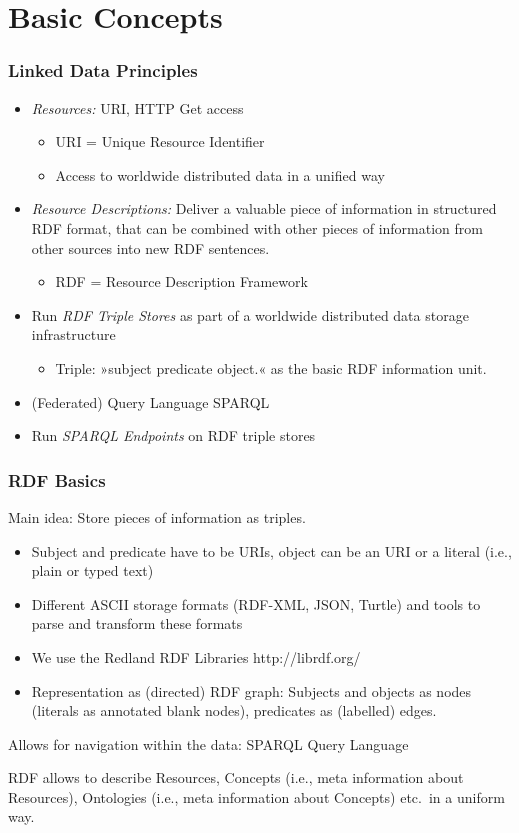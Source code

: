 \documentclass{beamer}
\begin{document}
\section{Basic Concepts}
\begin{frame}\frametitle{Linked Data Principles}
\begin{itemize}
\item \emph{Resources:} URI, HTTP Get access
\begin{itemize}
\item URI = Unique Resource Identifier
\item Access to worldwide distributed data in a unified way
\end{itemize}
\item \emph{Resource Descriptions:} Deliver a valuable piece of information in
  structured RDF format, that can be combined with other pieces of information
  from other sources into new RDF sentences.
\begin{itemize}
\item RDF = Resource Description Framework
\end{itemize}
\item Run \emph{RDF Triple Stores} as part of a worldwide distributed data
  storage infrastructure
\begin{itemize}
\item Triple: »subject predicate object.« as the basic RDF information unit.
\end{itemize}
\item (Federated) Query Language SPARQL
\item Run \emph{SPARQL Endpoints} on RDF triple stores
\end{itemize}
\end{frame}

\begin{frame}\frametitle{RDF Basics}
Main idea: Store pieces of information as triples.
\begin{itemize}
\item Subject and predicate have to be URIs, object can be an URI or a literal
  (i.e., plain or typed text)
\item Different ASCII storage formats (RDF-XML, JSON, Turtle) and tools to
  parse and transform these formats
\item We use the Redland RDF Libraries http://librdf.org/
\item Representation as (directed) RDF graph: Subjects and objects as nodes
  (literals as annotated blank nodes), predicates as (labelled) edges.
\end{itemize}
Allows for navigation within the data: SPARQL Query Language

RDF allows to describe Resources, Concepts (i.e., meta information about
Resources), Ontologies (i.e., meta information about Concepts) etc.\ in a
uniform way.
\end{frame}
\end{document}
